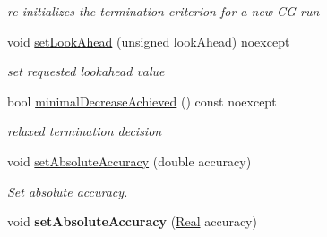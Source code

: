 \begin{DoxyCompactItemize}
\begin{DoxyCompactList}\small\item\em re-\/initializes the termination criterion for a new C\+G run \end{DoxyCompactList}\item 
void \hyperlink{classSpacy_1_1CG_1_1Termination_1_1StrakosTichyEnergyError_ac40343f544b7e2bfeffa7f7927cfeac5_ac40343f544b7e2bfeffa7f7927cfeac5}{set\+Look\+Ahead} (unsigned look\+Ahead) noexcept
\begin{DoxyCompactList}\small\item\em set requested lookahead value \end{DoxyCompactList}\item 
bool \hyperlink{classSpacy_1_1CG_1_1Termination_1_1StrakosTichyEnergyError_af13fec942d9d9ec622803e226537ffec_af13fec942d9d9ec622803e226537ffec}{minimal\+Decrease\+Achieved} () const noexcept
\begin{DoxyCompactList}\small\item\em relaxed termination decision \end{DoxyCompactList}\item 
void \hyperlink{classSpacy_1_1Mixin_1_1AbsoluteAccuracy_a71cfcdc0c504be63c18c3e78df157738_a71cfcdc0c504be63c18c3e78df157738}{set\+Absolute\+Accuracy} (double accuracy)
\begin{DoxyCompactList}\small\item\em Set absolute accuracy. \end{DoxyCompactList}\item 
\hypertarget{classSpacy_1_1Mixin_1_1AbsoluteAccuracy_ad099a4a0a770133b56acaaf8783d4ba6}{}void {\bfseries set\+Absolute\+Accuracy} (\hyperlink{classSpacy_1_1Real}{Real} accuracy)\label{classSpacy_1_1Mixin_1_1AbsoluteAccuracy_ad099a4a0a770133b56acaaf8783d4ba6}


\end{DoxyCompactItemize}
